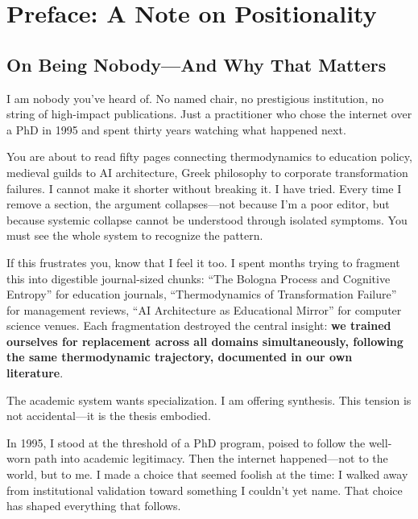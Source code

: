 \section*{Preface: A Note on Positionality}

\subsection*{On Being Nobody—And Why That Matters}

I am nobody you've heard of. No named chair, no prestigious institution, no string of high-impact publications. Just a practitioner who chose the internet over a PhD in 1995 and spent thirty years watching what happened next.

You are about to read fifty pages connecting thermodynamics to education policy, medieval guilds to AI architecture, Greek philosophy to corporate transformation failures. I cannot make it shorter without breaking it. I have tried. Every time I remove a section, the argument collapses—not because I'm a poor editor, but because systemic collapse cannot be understood through isolated symptoms. You must see the whole system to recognize the pattern.

If this frustrates you, know that I feel it too. I spent months trying to fragment this into digestible journal-sized chunks: ``The Bologna Process and Cognitive Entropy'' for education journals, ``Thermodynamics of Transformation Failure'' for management reviews, ``AI Architecture as Educational Mirror'' for computer science venues. Each fragmentation destroyed the central insight: \textbf{we trained ourselves for replacement across all domains simultaneously, following the same thermodynamic trajectory, documented in our own literature}.

The academic system wants specialization. I am offering synthesis. This tension is not accidental—it is the thesis embodied.

In 1995, I stood at the threshold of a PhD program, poised to follow the well-worn path into academic legitimacy. Then the internet happened—not to the world, but to me. I made a choice that seemed foolish at the time: I walked away from institutional validation toward something I couldn't yet name. That choice has shaped everything that follows.

